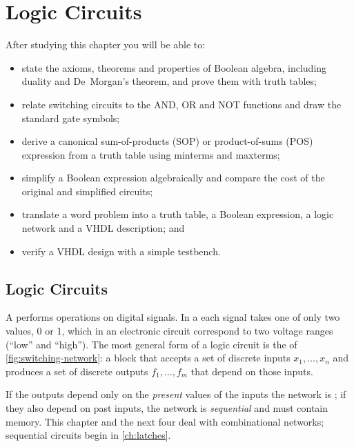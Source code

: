\chapter{Logic Circuits}\label{ch:logic}

\begin{objectives}
After studying this chapter you will be able to:
\begin{itemize}
  \item state the axioms, theorems and properties of Boolean algebra, including duality and De~Morgan's theorem, and prove them with truth tables;
  \item relate switching circuits to the AND, OR and NOT functions and draw the standard gate symbols;
  \item derive a canonical sum-of-products (SOP) or product-of-sums (POS) expression from a truth table using minterms and maxterms;
  \item simplify a Boolean expression algebraically and compare the cost of the original and simplified circuits;
  \item translate a word problem into a truth table, a Boolean expression, a logic network and a VHDL description; and
  \item verify a VHDL design with a simple testbench.
\end{itemize}
\end{objectives}

\section{Logic Circuits}
A  performs operations on digital signals. In a  each signal takes one of only two values, 0 or 1, which in an electronic circuit correspond to two voltage ranges (``low'' and ``high''). The most general form of a logic circuit is the  of \cref{fig:switching-network}: a block that accepts a set of discrete inputs $x_1,\dots,x_n$ and produces a set of discrete outputs $f_1,\dots,f_m$ that depend on those inputs.


If the outputs depend only on the \emph{present} values of the inputs the network is ; if they also depend on past inputs, the network is \emph{sequential} and must contain memory. This chapter and the next four deal with combinational networks; sequential circuits begin in \cref{ch:latches}.


